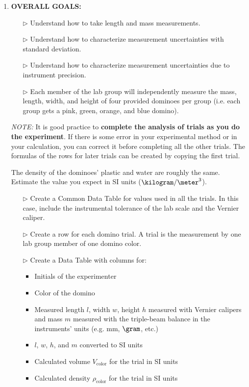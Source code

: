 \begin{enumerate}

\item \textbf{OVERALL GOALS:} 
\begin{itemize}
    \item[$\triangleright$] Understand how to take length and mass measurements.
    \item[$\triangleright$] Understand how to characterize measurement uncertainties with standard deviation.
    \item[$\triangleright$] Understand how to characterize measurement uncertainties due to instrument precision.
    \item[$\triangleright$] Each member of the lab group will independently measure the mass, length, width, and height of four provided dominoes per group (i.e. each group gets a pink, green, orange, and blue domino).
\end{itemize}

\textit{NOTE:} It is good practice to \textbf{complete the analysis of trials as you do the experiment}. If there is some error in your experimental method or in your calculation, you can correct it before completing all the other trials. The formulas of the rows for later trials can be created by copying the first trial.

The density of the dominoes' plastic and water are roughly the same. Estimate the value you expect in SI units ($\kilogram/\meter^{3}$). 

\begin{itemize}
	\item[$\triangleright$] Create a Common Data Table for values used in all the trials. In this case, include the instrumental tolerance of the lab scale and the Vernier caliper. 
	\item[$\triangleright$] Create a row for each domino trial. A trial is the measurement by one lab group member of one domino color.
	\item[$\triangleright$] Create a Data Table with columns for:
		\begin{itemize}
			\item Initials of the experimenter
			\item Color of the domino
			\item Measured length $l$, width $w$, height $h$ measured with Vernier calipers and mass $m$ measured with the triple-beam balance in the instruments' units (e.g. mm, $\gram$, etc.)
            \item $l$, $w$, $h$, and $m$ converted to SI units
			\item Calculated volume $V_\text{color}$ for the trial in SI units
			\item Calculated density $\rho_\text{color}$ for the trial in SI units
		\end{itemize}
\end{itemize}


\end{enumerate}
